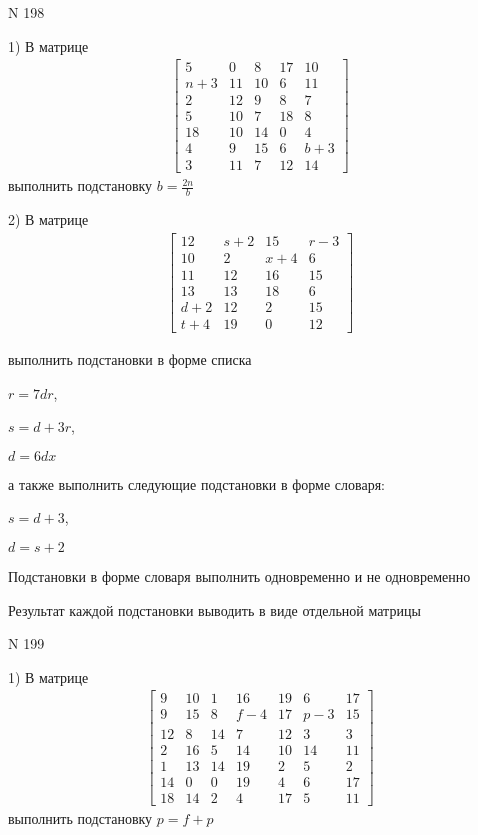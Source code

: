 \documentclass[11pt]{report}
\begin{document}
\newpage
N 198


    1) В матрице
\begin{align*}
\left[\begin{matrix}5 & 0 & 8 & 17 & 10\\n + 3 & 11 & 10 & 6 & 11\\2 & 12 & 9 & 8 & 7\\5 & 10 & 7 & 18 & 8\\18 & 10 & 14 & 0 & 4\\4 & 9 & 15 & 6 & b + 3\\3 & 11 & 7 & 12 & 14\end{matrix}\right]
\end{align*}
выполнить подстановку $b=\frac{2 n}{b}$


    2) В матрице
\begin{align*}
\left[\begin{matrix}12 & s + 2 & 15 & r - 3\\10 & 2 & x + 4 & 6\\11 & 12 & 16 & 15\\13 & 13 & 18 & 6\\d + 2 & 12 & 2 & 15\\t + 4 & 19 & 0 & 12\end{matrix}\right]
\end{align*}

выполнить подстановки в форме списка

$r=7 d r$,

$s=d + 3 r$,

$d=6 d x$

а также выполнить следующие подстановки в форме словаря:

$s=d + 3$,

$d=s + 2$


    Подстановки в форме словаря выполнить одновременно и не одновременно


    Результат каждой подстановки выводить в виде отдельной матрицы

\newpage
N 199


    1) В матрице
\begin{align*}
\left[\begin{matrix}9 & 10 & 1 & 16 & 19 & 6 & 17\\9 & 15 & 8 & f - 4 & 17 & p - 3 & 15\\12 & 8 & 14 & 7 & 12 & 3 & 3\\2 & 16 & 5 & 14 & 10 & 14 & 11\\1 & 13 & 14 & 19 & 2 & 5 & 2\\14 & 0 & 0 & 19 & 4 & 6 & 17\\18 & 14 & 2 & 4 & 17 & 5 & 11\end{matrix}\right]
\end{align*}
выполнить подстановку $p=f + p$
\end{document}
